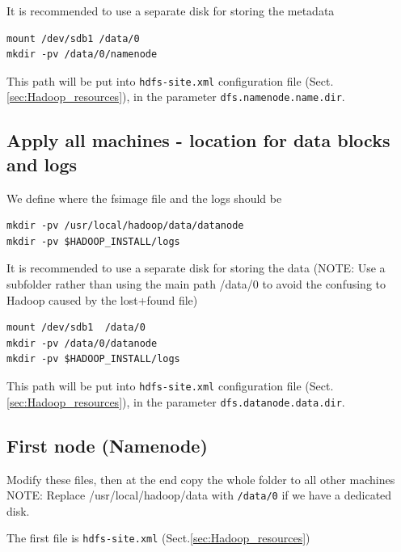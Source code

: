 It is recommended to use a separate disk for storing the metadata
\begin{verbatim}
mount /dev/sdb1 /data/0
mkdir -pv /data/0/namenode
\end{verbatim}

This path will be put into \verb!hdfs-site.xml! configuration file
(Sect.\ref{sec:Hadoop_resources}), in the parameter
\verb!dfs.namenode.name.dir!.

\subsection{Apply all machines - location for data blocks and logs}
\label{sec:location_datablocks}

We define where the fsimage file and the logs should be
\begin{verbatim}
mkdir -pv /usr/local/hadoop/data/datanode
mkdir -pv $HADOOP_INSTALL/logs
\end{verbatim}

It is recommended to use a separate disk for storing the data (NOTE: Use a
subfolder rather than using the main path /data/0 to avoid the
confusing to Hadoop caused by the lost+found file)
\begin{verbatim}
mount /dev/sdb1  /data/0
mkdir -pv /data/0/datanode
mkdir -pv $HADOOP_INSTALL/logs
\end{verbatim}


This path will be put into \verb!hdfs-site.xml! configuration file
(Sect.\ref{sec:Hadoop_resources}), in the parameter
\verb!dfs.datanode.data.dir!.

\subsection{First node (Namenode)}

Modify these files, then at the end copy the whole folder to all other machines
NOTE: Replace /usr/local/hadoop/data with \verb!/data/0! if we have a dedicated
disk.

The first file is \verb!hdfs-site.xml! (Sect.\ref{sec:Hadoop_resources})

